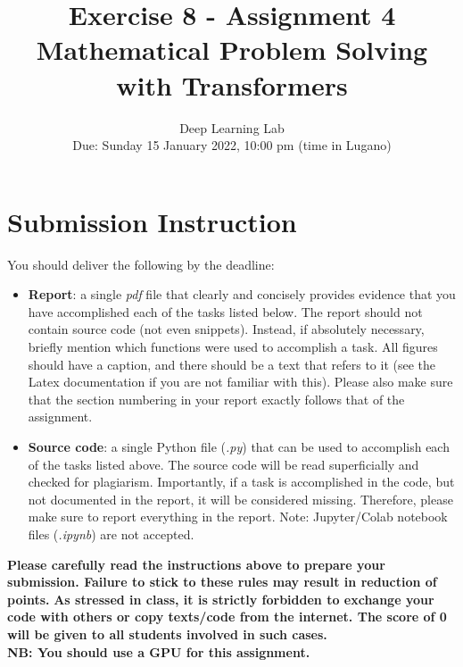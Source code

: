 \documentclass[a4paper,11pt]{article}
\title{Exercise 8 - \textbf{Assignment 4}\\
 \textbf{Mathematical Problem Solving with Transformers}}
\author{Deep Learning Lab\\
Due: Sunday 15 January 2022, 10:00 pm (time in Lugano)\\
}
\begin{document}
\maketitle

\section*{Submission Instruction}
You should deliver the following by the deadline:
\begin{itemize}
 \item \textbf{Report}: a single \emph{pdf} file that clearly and concisely provides evidence that you have accomplished each of the tasks listed below. The report should not contain source code (not even snippets). Instead, if absolutely necessary, briefly mention which functions were used to accomplish a task. All figures should have a caption, and there should be a text that refers to it (see the Latex documentation if you are not familiar with this). Please also make sure that the section numbering in your report exactly follows that of the assignment.
 \item \textbf{Source code}: a single Python file (\emph{.py}) that can be used to accomplish each of the tasks listed above.  The source code will be read superficially and checked for plagiarism.
 Importantly, if a task is accomplished in the code, but not documented in the report, it will be considered missing. Therefore, please make sure to report everything in the report. Note: Jupyter/Colab notebook files (\emph{.ipynb}) are not accepted.
\end{itemize}

\textbf{Please carefully read the instructions above to prepare your submission. Failure to stick to these rules may result in reduction of points.}
\textbf{As stressed in class, it is strictly forbidden to exchange your code with others or copy texts/code from the internet. The score of 0 will be given to all students involved in such cases.}\\

\textbf{NB: You should use a GPU for this assignment.}\\


\end{document}
